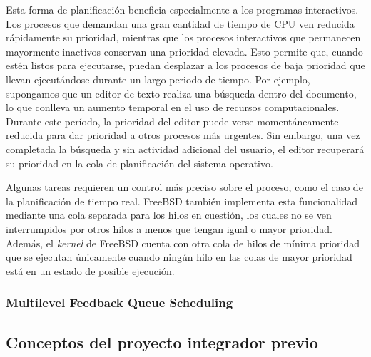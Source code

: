 Esta forma de planificación beneficia especialmente a los programas interactivos. Los procesos que demandan una gran cantidad de tiempo de CPU ven reducida rápidamente su prioridad, mientras que los procesos interactivos que permanecen mayormente inactivos conservan una prioridad elevada. Esto permite que, cuando estén listos para ejecutarse, puedan desplazar a los procesos de baja prioridad que llevan ejecutándose durante un largo periodo de tiempo. Por ejemplo, supongamos que un editor de texto realiza una búsqueda dentro del documento, lo que conlleva un aumento temporal en el uso de recursos computacionales. Durante este período, la prioridad del editor puede verse momentáneamente reducida para dar prioridad a otros procesos más urgentes. Sin embargo, una vez completada la búsqueda y sin actividad adicional del usuario, el editor recuperará su prioridad en la cola de planificación del sistema operativo.\par

Algunas tareas requieren un control más preciso sobre el proceso, como el caso de la planificación de tiempo real. FreeBSD también implementa esta funcionalidad mediante una cola separada para los hilos en cuestión, los cuales no se ven interrumpidos por otros hilos a menos que tengan igual o mayor prioridad. Además, el \textit{kernel} de FreeBSD cuenta con otra cola de hilos de mínima prioridad que se ejecutan únicamente cuando ningún hilo en las colas de mayor prioridad está en un estado de posible ejecución.\par

\subsubsection{Multilevel Feedback Queue Scheduling}




\subsection{Conceptos del proyecto integrador previo}

